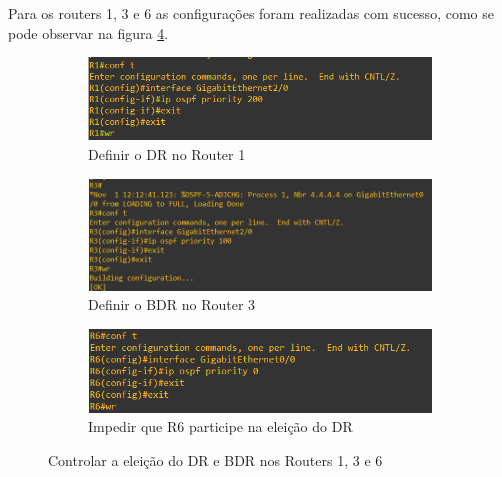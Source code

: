 \documentclass[11pt,english, openright, oneside]{book}
\begin{document}
Para os routers 1, 3 e 6 as configurações foram realizadas com sucesso, como se pode observar na figura \ref{fig:config9}.

\begin{figure}[h]
  \centering
  \begin{subfigure}{.53\textwidth}
      \centering
      \includegraphics[width=1\linewidth]{imagens/Tarefa2/8.dr_bdr_R1.png}
      \caption{Definir o DR no Router 1}
      \label{fig:router1}
  \end{subfigure}%
  \begin{subfigure}{.4\textwidth}
      \centering
      \includegraphics[width=1\linewidth]{imagens/Tarefa2/8.dr_bdr_R3.png}
      \caption{Definir o BDR no Router 3}
      \label{fig:router3}
  \end{subfigure}%

  \vspace{0.1cm}
  \begin{subfigure}{.53\textwidth}
      \centering
      \includegraphics[width=1\linewidth]{imagens/Tarefa2/8.dr_bdr_R6.png} 
      \caption{Impedir que R6 participe na eleição do DR}
      \label{fig:router6}
  \end{subfigure}
  \caption{Controlar a eleição do DR e BDR nos Routers 1, 3 e 6}
  \label{fig:config9}
\end{figure}
\vspace{0.2cm}
\end{document}
